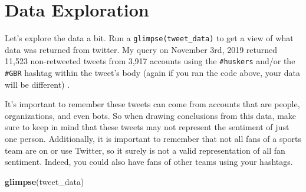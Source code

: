 \documentclass[
]{book}
\newenvironment{Shaded}{\begin{snugshade}}{\end{snugshade}}
\newcommand{\DataTypeTok}[1]{\textcolor[rgb]{0.13,0.29,0.53}{#1}}
\newcommand{\KeywordTok}[1]{\textcolor[rgb]{0.13,0.29,0.53}{\textbf{#1}}}
\newcommand{\NormalTok}[1]{#1}
\newcommand{\OperatorTok}[1]{\textcolor[rgb]{0.81,0.36,0.00}{\textbf{#1}}}
\newcommand{\OtherTok}[1]{\textcolor[rgb]{0.56,0.35,0.01}{#1}}
\newcommand{\StringTok}[1]{\textcolor[rgb]{0.31,0.60,0.02}{#1}}
\begin{document}
\begin{Shaded}
\end{Shaded}

\hypertarget{data-exploration}{%
\section{Data Exploration}\label{data-exploration}}

Let's explore the data a bit. Run a \texttt{glimpse(tweet\_data)} to get a view of what data was returned from twitter. My query on November 3rd, 2019 returned 11,523 non-retweeted tweets from 3,917 accounts using the \texttt{\#huskers} and/or the \texttt{\#GBR} hashtag within the tweet's body (again if you ran the code above, your data will be different) .

It's important to remember these tweets can come from accounts that are people, organizations, and even bots. So when drawing conclusions from this data, make sure to keep in mind that these tweets may not represent the sentiment of just one person. Additionally, it is important to remember that not all fans of a sports team are on or use Twitter, so it surely is not a valid representation of all fan sentiment. Indeed, you could also have fans of other teams using your hashtags.

\begin{Shaded}
\begin{Highlighting}[]
\KeywordTok{glimpse}\NormalTok{(tweet_data)}
\end{Highlighting}
\end{Shaded}
\end{document}
